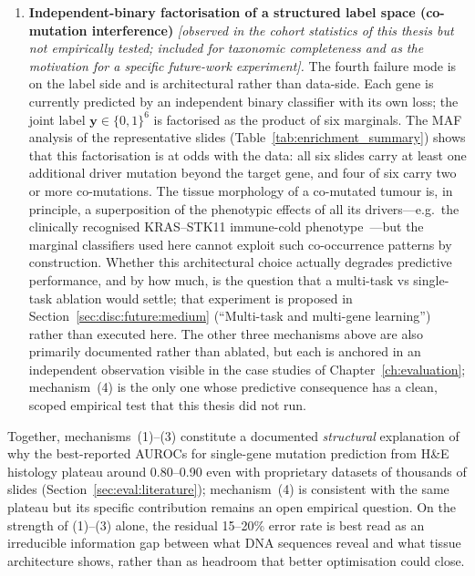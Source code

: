 \begin{enumerate}
    \item \textbf{Independent-binary factorisation of a structured
    label space (co-mutation interference)}
    \emph{[observed in the cohort statistics of this thesis but
    not empirically tested; included for taxonomic completeness
    and as the motivation for a specific future-work
    experiment].}
    The fourth failure mode is on the label side and is
    architectural rather than data-side.
    Each gene is currently predicted by an independent binary
    classifier with its own loss; the joint label
    $\mathbf{y} \in \{0,1\}^6$ is factorised as the product of
    six marginals.
    The MAF analysis of the representative slides
    (Table~\ref{tab:enrichment_summary}) shows that this
    factorisation is at odds with the data: all six slides carry
    at least one additional driver mutation beyond the target
    gene, and four of six carry two or more co-mutations.
    The tissue morphology of a co-mutated tumour is, in principle,
    a superposition of the phenotypic effects of all its
    drivers---e.g.\ the clinically recognised KRAS--STK11
    immune-cold phenotype~\cite{skoulidis2018stk11pd1,%
    skoulidis2015krassubsets}---but the marginal classifiers
    used here cannot exploit such co-occurrence patterns by
    construction.
    Whether this architectural choice actually degrades
    predictive performance, and by how much, is the question that
    a multi-task vs single-task ablation would settle; that
    experiment is proposed in
    Section~\ref{sec:disc:future:medium} (``Multi-task and
    multi-gene learning'') rather than executed here.
    The other three mechanisms above are also primarily
    documented rather than ablated, but each is anchored in an
    independent observation visible in the case studies of
    Chapter~\ref{ch:evaluation}; mechanism~(4) is the only one
    whose predictive consequence has a clean, scoped empirical
    test that this thesis did not run.
\end{enumerate}

Together, mechanisms~(1)--(3) constitute a documented
\emph{structural} explanation of why the best-reported AUROCs for
single-gene mutation prediction from H\&E histology plateau around
0.80--0.90 even with proprietary datasets of thousands of slides
(Section~\ref{sec:eval:literature}); mechanism~(4) is consistent
with the same plateau but its specific contribution remains an
open empirical question.
On the strength of (1)--(3) alone, the residual 15--20\% error
rate is best read as an irreducible information gap between what
DNA sequences reveal and what tissue architecture shows, rather
than as headroom that better optimisation could close.

